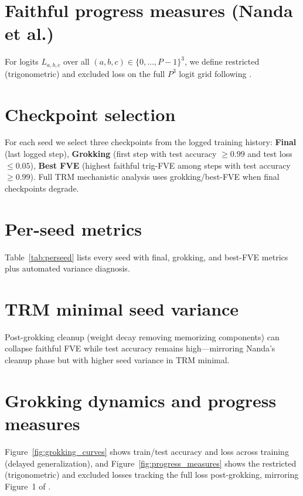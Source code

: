 \section{Faithful progress measures (Nanda et al.)}
\label{app:progress}

For logits $L_{a,b,c}$ over all $(a,b,c)\in\{0,\ldots,P{-}1\}^3$, we define restricted (trigonometric) and excluded loss on the full $P^3$ logit grid following \citet{nanda2023progress}.

\section{Checkpoint selection}
\label{app:checkpoints}

For each seed we select three checkpoints from the logged training history:
\textbf{Final} (last logged step),
\textbf{Grokking} (first step with test accuracy $\geq 0.99$ and test loss $\leq 0.05$),
\textbf{Best FVE} (highest faithful trig-FVE among steps with test accuracy $\geq 0.99$).
Full TRM mechanistic analysis uses grokking/best-FVE when final checkpoints degrade.



\section{Per-seed metrics}
\label{app:perseed}

Table~\ref{tab:perseed} lists every seed with final, grokking, and best-FVE metrics plus automated variance diagnosis.



\section{TRM minimal seed variance}
\label{app:variance}

Post-grokking cleanup (weight decay removing memorizing components) can collapse faithful FVE while test accuracy remains high---mirroring Nanda's cleanup phase but with higher seed variance in TRM minimal.



\section{Grokking dynamics and progress measures}
\label{app:grokking}

Figure~\ref{fig:grokking_curves} shows train/test accuracy and loss across
training (delayed generalization), and Figure~\ref{fig:progress_measures} shows
the restricted (trigonometric) and excluded losses tracking the full loss
post-grokking, mirroring Figure~1 of \citet{nanda2023progress}.

